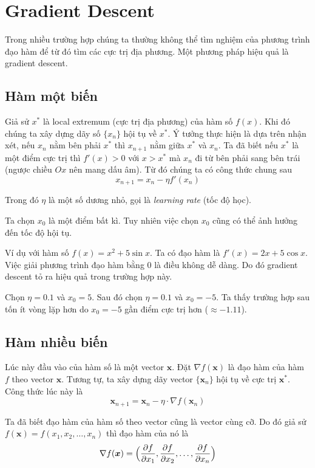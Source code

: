\documentclass{mynotes}
\begin{document}
\section{Gradient Descent}

Trong nhiều trường hợp chúng ta thường không thể tìm nghiệm của phương trình đạo hàm để từ đó tìm các cực trị địa phương. Một phương pháp hiệu quả là gradient descent.

\subsection{Hàm một biến}

Giả sử $x^*$ là local extremum (cực trị địa phương) của hàm số $f(x)$. Khi đó chúng ta xây dựng dãy số $\{ x_n \}$ hội tụ về $x^*$. Ý tưởng thực hiện là dựa trên nhận xét, nếu $x_n$ nằm bên phải $x^*$ thì $x_{n+1}$ nằm giữa $x^*$ và $x_n$. Ta đã biết nếu $x^*$ là một điểm cực trị thì $f'(x) > 0$ với $x > x^*$ mà $x_n$ đi từ bên phải sang bên trái (ngược chiều $Ox$ nên mang dấu âm). Từ đó chúng ta có công thức chung sau \[x_{n+1} = x_n - \eta f'(x_n)\]

Trong đó $\eta$ là một số dương nhỏ, gọi là \textit{learning rate} (tốc độ học).

Ta chọn $x_0$ là một điểm bất kì. Tuy nhiên việc chọn $x_0$ cũng có thể ảnh hưởng đến tốc độ hội tụ.

Ví dụ với hàm số $f(x) = x^2 + 5 \sin x$. Ta có đạo hàm là $f'(x) = 2x + 5 \cos x$. Việc giải phương trình đạo hàm bằng 0 là điều không dễ dàng. Do đó gradient descent tỏ ra hiệu quả trong trường hợp này.

Chọn $\eta = 0.1$ và $x_0 = 5$. Sau đó chọn $\eta = 0.1$ và $x_0 = -5$. Ta thấy trường hợp sau tốn ít vòng lặp hơn do $x_0 = -5$ gần điểm cực trị hơn ($\approx -1.11$).

\subsection{Hàm nhiều biến}

Lúc này đầu vào của hàm số là một vector $\bm{x}$. Đặt $\nabla f(\bm{x})$ là đạo hàm của hàm $f$ theo vector $\bm{x}$. Tương tự, ta xây dựng dãy vector $\{ \bm{x}_n \}$ hội tụ về cực trị $\bm{x}^*$. Công thức lúc này là \[\bm{x}_{n+1} = \bm{x}_n - \eta \cdot \nabla f(\bm{x}_n)\]

Ta đã biết đạo hàm của hàm số theo vector cũng là vector cùng cỡ. Do đó giả sử $f(\bm{x}) = f(x_1, x_2, \ldots, x_n)$ thì đạo hàm của nó là \[\nabla f(\bm{x}) = \Bigl( \dfrac{\partial f}{\partial x_1}, \dfrac{\partial f}{\partial x_2}, \ldots, \dfrac{\partial f}{\partial x_n}\Bigr)\]
\end{document}
